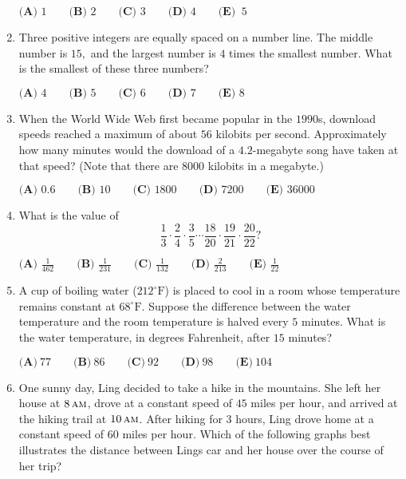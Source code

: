 \documentclass{article}
\begin{document}
\begin{enumerate}[label=\arabic*., itemsep=0.5em]
\(\textbf{(A) } 1 \qquad \textbf{(B) } 2 \qquad \textbf{(C) } 3 \qquad \textbf{(D) } 4 \qquad \textbf{(E) } ~5\)\par \vspace{0.5em}\item Three positive integers are equally spaced on a number line. The middle number is \(15,\) and the largest number is \(4\) times the smallest number. What is the smallest of these three numbers? 

\(\textbf{(A) } 4 \qquad \textbf{(B) } 5 \qquad \textbf{(C) } 6 \qquad \textbf{(D) } 7 \qquad \textbf{(E) } 8\)\par \vspace{0.5em}\item When the World Wide Web first became popular in the \(1990\)s, download speeds reached a maximum of about \(56\) kilobits per second. Approximately how many minutes would the download of a \(4.2\)-megabyte song have taken at that speed? (Note that there are \(8000\) kilobits in a megabyte.)

\(\textbf{(A) } 0.6 \qquad \textbf{(B) } 10 \qquad \textbf{(C) } 1800 \qquad \textbf{(D) } 7200 \qquad \textbf{(E) } 36000\)\par \vspace{0.5em}\item What is the value of 
\begin{equation*}
\frac{1}{3}\cdot\frac{2}{4}\cdot\frac{3}{5}\cdots\frac{18}{20}\cdot\frac{19}{21}\cdot\frac{20}{22}?
\end{equation*}


\(\textbf{(A) } \frac{1}{462} \qquad \textbf{(B) } \frac{1}{231} \qquad \textbf{(C) } \frac{1}{132} \qquad \textbf{(D) } \frac{2}{213} \qquad \textbf{(E) } \frac{1}{22}\)\par \vspace{0.5em}\item A cup of boiling water (\(212^{\circ}\text{F}\)) is placed to cool in a room whose temperature remains constant at \(68^{\circ}\text{F}\). Suppose the difference between the water temperature and the room temperature is halved every \(5\) minutes. What is the water temperature, in degrees Fahrenheit, after \(15\) minutes?
 
\(\textbf{(A)} ~77\qquad\textbf{(B)} ~86\qquad\textbf{(C)} ~92\qquad\textbf{(D)} ~98\qquad\textbf{(E)} ~104\)\par \vspace{0.5em}\item One sunny day, Ling decided to take a hike in the mountains. She left her house at \(8 \, \textsc{am}\), drove at a constant speed of \(45\) miles per hour, and arrived at the hiking trail at \(10 \, \textsc{am}\). After hiking for \(3\) hours, Ling drove home at a constant speed of \(60\) miles per hour. Which of the following graphs best illustrates the distance between Lings car and her house over the course of her trip?



\end{enumerate}
\end{document}
